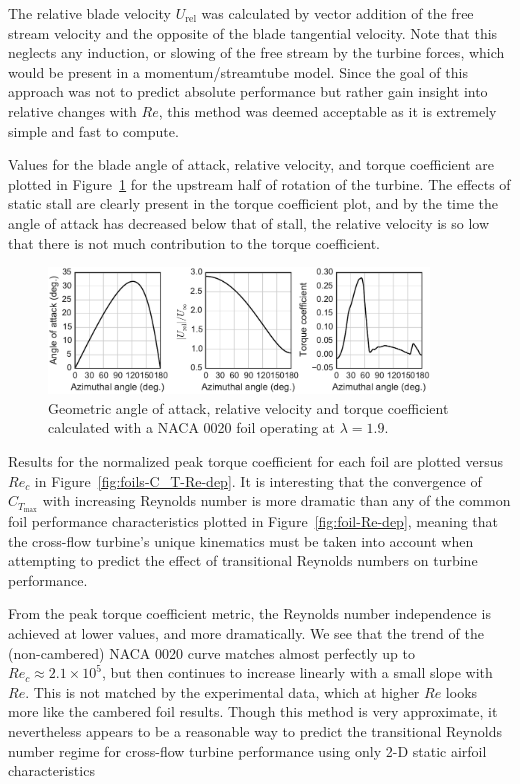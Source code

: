 \documentclass[energies,article,accept,moreauthors,pdftex,12pt,a4paper]{mdpi}
\begin{document}
The relative blade velocity $U_\mathrm{rel}$ was calculated by vector addition
of the free stream velocity and the opposite of the blade tangential velocity.
Note that this neglects any induction, or slowing of the free stream by the
turbine forces, which would be present in a momentum/streamtube model. Since the
goal of this approach was not to predict absolute performance but rather gain
insight into relative changes with $Re$, this method was deemed acceptable as it
is extremely simple and fast to compute.

Values for the blade angle of attack, relative velocity, and torque coefficient
are plotted in Figure~\ref{fig:blade-kinematics} for the upstream half of
rotation of the turbine. The effects of static stall are clearly present in the
torque coefficient plot, and by the time the angle of attack has decreased below
that of stall, the relative velocity is so low that there is not much
contribution to the torque coefficient.

\begin{figure}[ht!]
\centering

\includegraphics[width=0.9\textwidth]{figures/foil_kinematics_ct}

\caption{Geometric angle of attack, relative velocity and torque coefficient
    calculated with a NACA 0020 foil operating at $\lambda=1.9$.}

\label{fig:blade-kinematics}
\end{figure}

Results for the normalized peak torque coefficient for each foil are plotted
versus $Re_c$ in Figure~\ref{fig:foils-C_T-Re-dep}. It is interesting that the
convergence of $C_{T_\mathrm{max}}$ with increasing Reynolds number is more
dramatic than any of the common foil performance characteristics plotted in
Figure~\ref{fig:foil-Re-dep}, meaning that the cross-flow turbine's unique
kinematics must be taken into account when attempting to predict the effect of
transitional Reynolds numbers on turbine performance.

From the peak torque coefficient metric, the Reynolds number independence is
achieved at lower values, and more dramatically. We see that the trend of the
(non-cambered) NACA 0020 curve matches almost perfectly up to $Re_c \approx 2.1
\times 10^5$, but then continues to increase linearly with a small slope with
$Re$. This is not matched by the experimental data, which at higher $Re$ looks
more like the cambered foil results. Though this method is very approximate, it
nevertheless appears to be a reasonable way to predict the transitional Reynolds
number regime for cross-flow turbine performance using only 2-D static airfoil
characteristics
\end{document}
